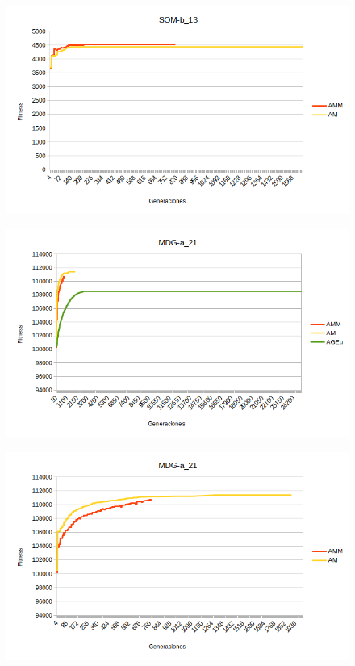 \documentclass[11pt,a4paper]{article}
\begin{document}
	\begin{figure}[H] 
		\centering
		\includegraphics[scale=0.9]{../output/P2/exp3/SOM2}
	\end{figure}
	
	\begin{figure}[H] 
		\centering
		\includegraphics[scale=1]{../output/P2/exp3/MDG1}
	\end{figure}
	
	\begin{figure}[H] 
		\centering
		\includegraphics[scale=1]{../output/P2/exp3/MDG2}
	\end{figure}
\end{document}
